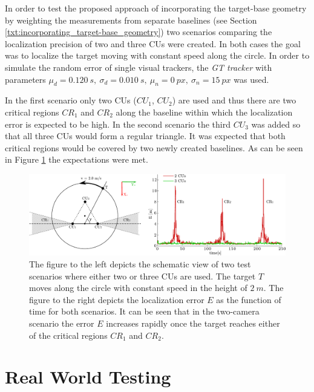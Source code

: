 In order to test the proposed approach of incorporating the target-base geometry by weighting the measurements from separate baselines (see Section \ref{txt:incorporating_target-base_geometry}) two scenarios comparing the localization precision of two and three CUs were created. In both cases the goal was to localize the target moving with constant speed along the circle. In order to simulate the random error of single visual trackers, the \textit{GT tracker} with parameters $\mu_{d} = 0.120~s,~\sigma_{d} = 0.010~s,~\mu_{n} = 0~px,~\sigma_{n} = 15~px$ was used. 

In the first scenario only two CUs ($CU_{1}$, $CU_{2}$) are used and thus there are two critical regions $CR_{1}$ and $CR_{2}$ along the baseline within which the localization error is expected to be high. In the second scenario the third $CU_{3}$ was added so that all three CUs would form a regular triangle. It was expected that both critical regions would be covered by two newly created baselines. As can be seen in Figure \ref{fig:test_two_vs_three_cus} the expectations were met.

\begin{figure}[htb]\centering
	\centering
	\includegraphics[width=0.95\linewidth]{fig/schema_two_vs_three_units_and_plot.pdf}
	\caption{The figure to the left depicts the schematic view of two test scenarios where either two or three CUs are used. The target $T$ moves along the circle with constant speed in the height of $2~m$. The figure to the right depicts the localization error $E$ as the function of time for both scenarios. It can be seen that in the two-camera scenario the error $E$ increases rapidly once the target reaches either of the critical regions $CR_{1}$ and $CR_{2}$.}
	\label{fig:test_two_vs_three_cus}
\end{figure}
	
\section{Real World Testing} \label{txt:real_world_testing}

